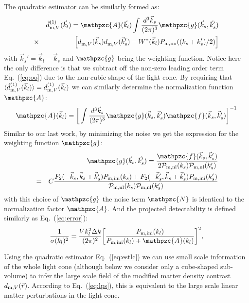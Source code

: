 \documentclass[prd,amsmath,amssymb,floatfix,superscriptaddress,nofootinbib,twocolumn]{revtex4-1}
\def\be{\begin{equation}}
\def\ee{\end{equation}}
\def\bea{\begin{eqnarray}}
\def\eea{\end{eqnarray}}
\newcommand{\vrr}{\vec{r}}
\newcommand{\vs}{\nonumber\\}
\newcommand{\vk}{\vec{k}}
\newcommand{\ec}[1]{Eq.~(\ref{eq:#1})}
\newcommand{\eql}[1]{\label{eq:#1}}
\newcommand{\rf}[1]{\ref{fig:#1}}
\newcommand{\sfig}[2]{
\texttt{[image: ../plots/\#1]}
        }
\newcommand{\Sfig}[2]{
   \begin{figure}[thbp]
   \begin{center}
    \sfig{../plots/#1.pdf}{\columnwidth}
    \caption{{\small #2}}
    \label{fig:#1}
     \end{center}
   \end{figure}
}
\begin{document}
\noindent The quadratic estimator can be similarly formed as:
\bea
&&\hat{d}^{(1)}_{{\rm m},V}(\vk_l)=\mathpzc{A}(\vk_l)\int \frac{d^{3}\vk_s}{(2\pi)^3} \mathpzc{g}(\vk_s,\vk_s')\vs
&\times& \left[d^{}_{{\rm m},V}(\vk_s)d^{}_{{\rm m},V}(\vk_s')-{W}^{*}(\vec{k}_l)P_{\rm m,ini}(({k}_s +{k}'_s)/2)\right] \vs \eql{estlc}
\eea 
with $\vk_s' = \vk_l-\vk_s$ and $\mathpzc{g}$ being the weighting function. Notice here the only difference is that we subtract off the non-zero leading order term \ec{oo} due to the non-cubic shape of the light cone. By requiring that $\langle \hat{d}^{(1)}_{{\rm m},V}(\vec{k}_l) \rangle={d}^{(1)}_{{\rm m},V}(\vec{k}_l)$ we can similarly determine the normalization function $\mathpzc{A}$:
\begin{eqnarray}
\mathpzc{A}(\vec{k}_l)=\bigg[\int \frac{d^3 \vec{k}_s}{(2\pi)^3} \mathpzc{g}(\vec{k}_s,\vec{k}_s')\mathpzc{f}(\vec{k}_s,\vec{k}_s')  \bigg]^{-1} \eql{a}
\end{eqnarray}
Similar to our last work, by minimizing the noise we get the expression for the weighting function $\mathpzc{g}$:
\begin{eqnarray}
&&\mathpzc{g}(\vec{k}_{s},\vec{k}_{s}')
=\frac{\mathpzc{f}(\vec{k}_{s},\vec{k}_{s}')}{2\mathcal{P}_{\rm m,nl}(k_{s})\mathcal{P}_{\rm m,nl}(k_{s}')}\vs
&=&C\frac{F_2(-\vec{k}_s,\vec{k}_s+\vec{k}_s')P_{\rm m,ini}(k_s)+F_2(-\vec{k}_s',\vec{k}_s+\vec{k}_s')P_{\rm m,ini}(k_s')}{\mathcal{P}_{\rm m,nl}(k_{s})\mathcal{P}_{\rm m,nl}(k_{s}')}\vs 
\end{eqnarray} 
with this choice of $\mathpzc{g}$ the noise term $\mathpzc{N}$ is identical to the normalization factor $\mathpzc{A}$. And the projected detectability is defined similarly as \ec{error}:
\be
\frac{1}{\sigma(k_l)^2}=\frac{V k_l^2 \Delta k }{(2\pi)^2}\bigg[\frac{P_{\rm m,ini}(k_l)}{P_{\rm m,ini}(k_l)+\mathpzc{A}(k_l) }\bigg]^2 \eql{error1},
\ee

Using the quadratic estimator \ec{estlc} we can use small scale information of the whole light cone (although below we consider only a cube-shaped sub-volume) to infer the large scale field of the modified matter density contrast $d_{{\rm m},V}(\vrr)$. According to \ec{lps}, this is equivalent to the large scale linear matter perturbations in the light cone.
\end{document}
